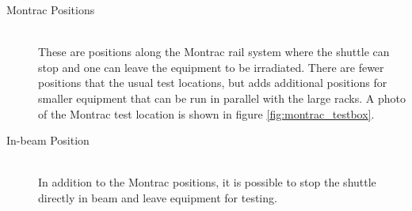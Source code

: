 \begin{description}
\item[Montrac Positions] \hfill \\
These are positions along the Montrac rail system where the shuttle can stop and one can leave the equipment to be irradiated. There are fewer positions that the usual test locations, but adds additional positions for smaller equipment that can be run in parallel with the large racks. A photo of the Montrac test location is shown in figure \ref{fig:montrac_testbox}.

\item[In-beam Position] \hfill \\
In addition to the Montrac positions, it is possible to stop the shuttle directly in beam and leave equipment for testing.
\end{description}

